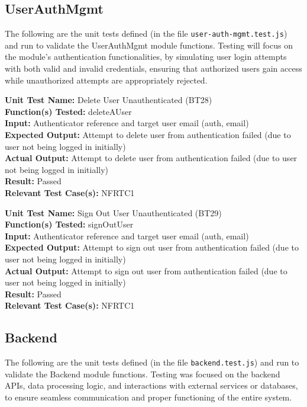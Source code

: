 \documentclass[12pt, titlepage]{article}
\begin{document}
\subsection{UserAuthMgmt}
The following are the unit tests defined (in the file \texttt{user-auth-mgmt.test.js}) and run to validate the UserAuthMgmt module functions. Testing will focus on the module's authentication functionalities, by simulating user login attempts with both valid and invalid credentials, ensuring that authorized users gain access while unauthorized attempts are appropriately rejected.

\begin{mdframed}[linewidth=0.5mm]
  \textbf{Unit Test Name:} Delete User Unauthenticated (BT28) \\
  \textbf{Function(s) Tested:} deleteAUser \\
  \textbf{Input:} Authenticator reference and target user email (auth, email) \\
  \textbf{Expected Output:} Attempt to delete user from authentication failed (due to user not being logged in initially) \\
  \textbf{Actual Output:} Attempt to delete user from authentication failed (due to user not being logged in initially) \\
  \textbf{Result:} Passed \\
  \textbf{Relevant Test Case(s):} NFRTC1
\end{mdframed}

\begin{mdframed}[linewidth=0.5mm]
  \textbf{Unit Test Name:} Sign Out User Unauthenticated (BT29) \\
  \textbf{Function(s) Tested:} signOutUser \\
  \textbf{Input:} Authenticator reference and target user email (auth, email) \\
  \textbf{Expected Output:} Attempt to sign out user from authentication failed (due to user not being logged in initially) \\
  \textbf{Actual Output:} Attempt to sign out user from authentication failed (due to user not being logged in initially) \\
  \textbf{Result:} Passed \\
  \textbf{Relevant Test Case(s):} NFRTC1
\end{mdframed}

\subsection{Backend}
The following are the unit tests defined (in the file \texttt{backend.test.js}) and run to validate the Backend module functions. Testing was focused on the backend APIs, data processing logic, and interactions with external services or databases, to ensure seamless communication and proper functioning of the entire system.
\end{document}
